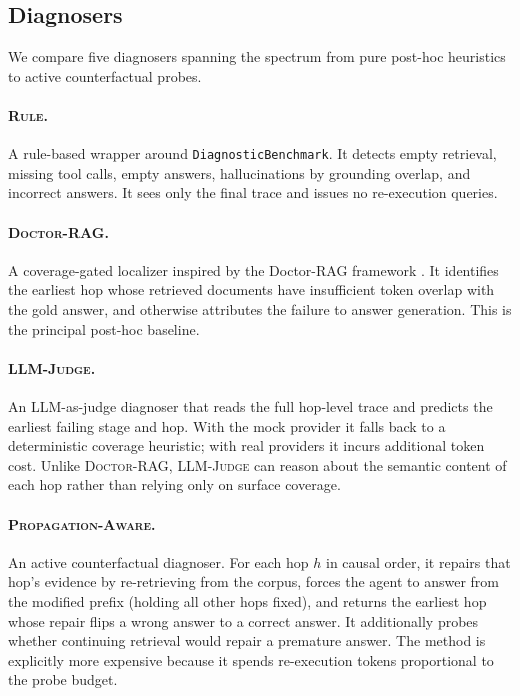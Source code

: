 \documentclass[11pt]{article}
\newcommand{\dr}{\textnormal{\textsc{Doctor-RAG}}}
\newcommand{\pa}{\textnormal{\textsc{Propagation-Aware}}}
\newcommand{\lj}{\textnormal{\textsc{LLM-Judge}}}
\newcommand{\rb}{\textnormal{\textsc{Rule}}}
\begin{document}
\subsection{Diagnosers}
\label{sec:diagnosers}

We compare five diagnosers spanning the spectrum from pure post-hoc heuristics
to active counterfactual probes.

\paragraph{\rb.}
A rule-based wrapper around \texttt{DiagnosticBenchmark}.  It detects empty
retrieval, missing tool calls, empty answers, hallucinations by grounding
overlap, and incorrect answers.  It sees only the final trace and issues no
re-execution queries.

\paragraph{\dr.}
A coverage-gated localizer inspired by the Doctor-RAG framework
\citep{jiao2026doctorrag}.  It identifies the earliest hop whose retrieved
documents have insufficient token overlap with the gold answer, and otherwise
attributes the failure to answer generation.  This is the principal post-hoc
baseline.

\paragraph{\lj.}
An LLM-as-judge diagnoser that reads the full hop-level trace and predicts the
earliest failing stage and hop.  With the mock provider it falls back to a
deterministic coverage heuristic; with real providers it incurs additional
token cost.  Unlike \dr, \lj{} can reason about the semantic content of each
hop rather than relying only on surface coverage.

\paragraph{\pa.}
An active counterfactual diagnoser.  For each hop $h$ in causal order, it
repairs that hop's evidence by re-retrieving from the corpus, forces the agent
to answer from the modified prefix (holding all other hops fixed), and returns
the earliest hop whose repair flips a wrong answer to a correct answer.  It
additionally probes whether continuing retrieval would repair a premature answer.
The method is explicitly more expensive because it spends re-execution tokens
proportional to the probe budget.
\end{document}

